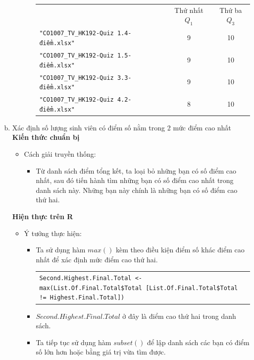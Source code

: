 \documentclass[a4paper]{article}
\theoremstyle{definition}
\begin{document}
\begin{enumerate}[a)]
\begin{itemize}
\begin{itemize}
\begin{center}
\begin{tabular}{l c c}
                     & Thứ nhất $Q_1$ & Thứ ba $Q_3$\\
                     \texttt{"CO1007\_TV\_HK192-Quiz 1.4-điểm.xlsx"} & 9 & 10\\
                     \texttt{"CO1007\_TV\_HK192-Quiz 1.5-điểm.xlsx"} & 9 & 10\\
                     \texttt{"CO1007\_TV\_HK192-Quiz 3.3-điểm.xlsx"} & 9 & 10\\
                     \texttt{"CO1007\_TV\_HK192-Quiz 4.2-điểm.xlsx"} & 8 & 10
                \end{tabular}
            \end{center}
        \end{itemize}
    \end{itemize}
    \bf\item {Xác định số lượng sinh viên có điểm số nằm trong 2 mức điểm cao nhất}\\[6pt]
    \bf Kiến thức chuẩn bị\normalfont
    \begin{itemize}
        \item Cách giải truyền thống:
        \begin{itemize}
            \item Từ danh sách điểm tổng kết, ta loại bỏ những bạn có số điểm cao nhất, sau đó tiến hành tìm những bạn có số điểm cao nhất trong danh sách này. Những bạn này chính là những bạn có số điểm cao thứ hai.
        \end{itemize}
    \end{itemize}
    \bf Hiện thực trên R\normalfont
    \begin{itemize}
        \item Ý tưởng thực hiện:
        \begin{itemize}
            \item Ta sử dụng hàm $max()$ kèm theo điều kiện điểm số khác điểm cao nhất để xác định mức điểm cao thứ hai.
            \begin{center}
                \begin{tabular}{p{13cm}}
                    \texttt{Second.Highest.Final.Total <- max(List.Of.Final.Total\$Total [List.Of.Final.Total\$Total != Highest.Final.Total])}
                \end{tabular}
            \end{center}
            \item $Second.Highest.Final.Total$ ở đây là điểm cao thứ hai trong danh sách.
            \item Ta tiếp tục sử dụng hàm $subset()$ để lập danh sách các bạn có điểm số lớn hơn hoặc bằng giá trị vừa tìm được.

\end{itemize}
\end{itemize}
\end{enumerate}
\end{document}
